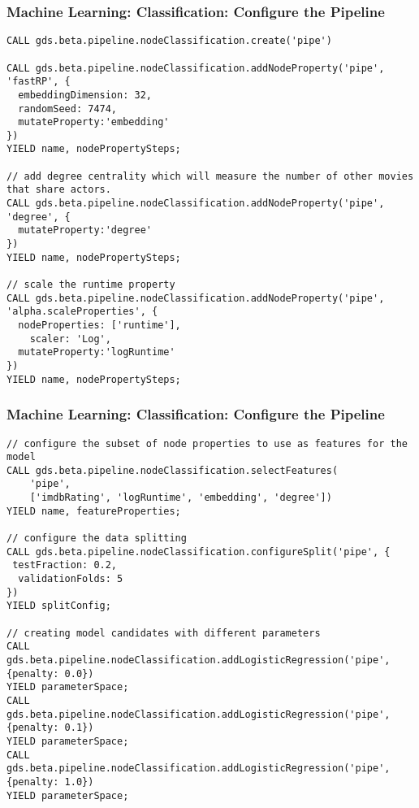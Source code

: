 \begin{frame}[fragile]\frametitle{Machine Learning: Classification: Configure the Pipeline}



\begin{lstlisting}
CALL gds.beta.pipeline.nodeClassification.create('pipe')

CALL gds.beta.pipeline.nodeClassification.addNodeProperty('pipe', 'fastRP', {
  embeddingDimension: 32,
  randomSeed: 7474,
  mutateProperty:'embedding'
})
YIELD name, nodePropertySteps;

// add degree centrality which will measure the number of other movies that share actors.
CALL gds.beta.pipeline.nodeClassification.addNodeProperty('pipe', 'degree', {
  mutateProperty:'degree'
})
YIELD name, nodePropertySteps;

// scale the runtime property
CALL gds.beta.pipeline.nodeClassification.addNodeProperty('pipe', 'alpha.scaleProperties', {
  nodeProperties: ['runtime'],
    scaler: 'Log',
  mutateProperty:'logRuntime'
})
YIELD name, nodePropertySteps;
\end{lstlisting}
\end{frame}
\begin{frame}[fragile]\frametitle{Machine Learning: Classification: Configure the Pipeline}

\begin{lstlisting}
// configure the subset of node properties to use as features for the model
CALL gds.beta.pipeline.nodeClassification.selectFeatures(
    'pipe',
    ['imdbRating', 'logRuntime', 'embedding', 'degree'])
YIELD name, featureProperties;

// configure the data splitting
CALL gds.beta.pipeline.nodeClassification.configureSplit('pipe', {
 testFraction: 0.2,
  validationFolds: 5
})
YIELD splitConfig;

// creating model candidates with different parameters
CALL gds.beta.pipeline.nodeClassification.addLogisticRegression('pipe', {penalty: 0.0})
YIELD parameterSpace;
CALL gds.beta.pipeline.nodeClassification.addLogisticRegression('pipe', {penalty: 0.1})
YIELD parameterSpace;
CALL gds.beta.pipeline.nodeClassification.addLogisticRegression('pipe', {penalty: 1.0})
YIELD parameterSpace;
\end{lstlisting}
\end{frame}


